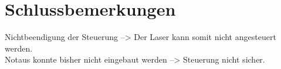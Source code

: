 \section{Schlussbemerkungen}
Nichtbeendigung der Steuerung --> Der Laser kann somit nicht angesteuert werden.\\
Notaus konnte bisher nicht eingebaut werden --> Steuerung nicht sicher.
